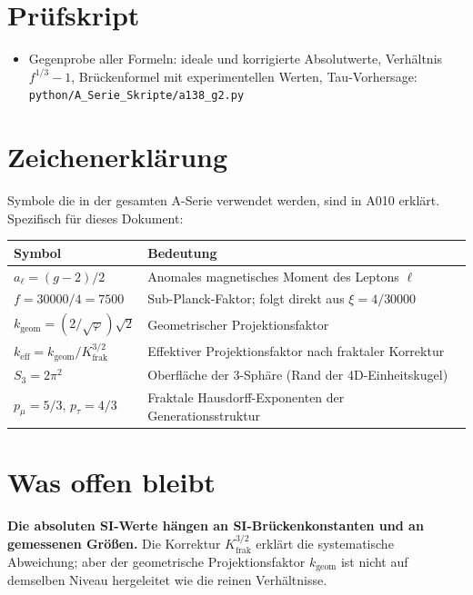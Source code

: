 \section{Prüfskript}

\begin{itemize}[leftmargin=2em,itemsep=2pt,topsep=2pt]
  \item Gegenprobe aller Formeln: ideale und korrigierte Absolutwerte,
    Verhältnis $f^{1/3}-1$, Brückenformel mit experimentellen Werten,
    Tau-Vorhersage:
    \texttt{python/A\_Serie\_Skripte/a138\_g2.py}
\end{itemize}


\section{Zeichenerklärung}

Symbole die in der gesamten A-Serie verwendet werden, sind in A010 erklärt.
Spezifisch für dieses Dokument:

\begin{center}
\renewcommand{\arraystretch}{1.3}
{\small\begin{tabular}{lp{9cm}}
\toprule
Symbol & Bedeutung \\
\midrule
$a_\ell = (g-2)/2$ & Anomales magnetisches Moment des Leptons $\ell$ \\
$f = 30000/4 = 7500$ & Sub-Planck-Faktor; folgt direkt aus $\xi=4/30000$ \\
$k_\text{geom} = (2/\sqrt\varphi)\sqrt2$ & Geometrischer Projektionsfaktor \\
$k_\text{eff} = k_\text{geom}/K_\text{frak}^{3/2}$ & Effektiver Projektionsfaktor
  nach fraktaler Korrektur \\
$S_3 = 2\pi^2$ & Oberfläche der 3-Sphäre (Rand der 4D-Einheitskugel) \\
$p_\mu = 5/3$, $p_\tau = 4/3$ & Fraktale Hausdorff-Exponenten der
  Generationsstruktur \\
\bottomrule
\end{tabular}}
\renewcommand{\arraystretch}{1.0}
\end{center}

\section{Was offen bleibt}

\textbf{Die absoluten SI-Werte hängen an SI-Brückenkonstanten und an gemessenen
Größen.} Die Korrektur $K_\text{frak}^{3/2}$ erklärt die systematische
Abweichung; aber der geometrische Projektionsfaktor $k_\text{geom}$ ist nicht
auf demselben Niveau hergeleitet wie die reinen Verhältnisse.

